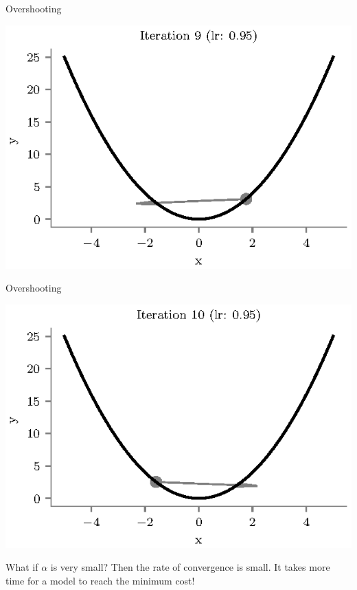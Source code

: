 \documentclass{beamer}
\begin{document}
\begin{frame}{Overshooting}
\begin{center}
\includegraphics[totalheight=6cm]{overshooting-9.eps}
\end{center}
\end{frame}

\begin{frame}{Overshooting}
\begin{center}
\includegraphics[totalheight=6cm]{overshooting-10.eps}
\end{center}
\end{frame}

\begin{frame}{What if $\alpha$ is very small?}
Then the rate of convergence is small. It takes more time for a model to reach the minimum cost!
\end{frame}
\end{document}
